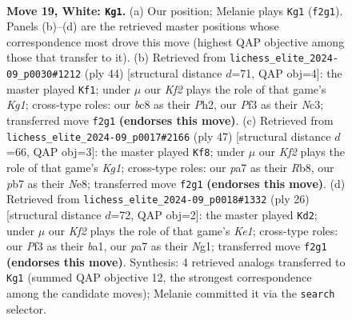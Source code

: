 \documentclass[11pt]{article}
\begin{document}
\begin{figure}[p]
\label{fig:thought-m34}
\end{figure}

\clearpage

\begin{figure}[p]\centering
\begin{subfigure}{0.46\textwidth}\centering
\resizebox{\linewidth}{!}{%
\newchessgame
\chessboard[
  setfen={r1b3k1/ppppn2p/8/5pp1/8/1PN2P2/P1PPBKPP/R7 w - - 0 19},
  showmover=false,
  pgfstyle=straightmove, color=movearrow, markmove={f2-g1}
]}
\caption{}
\end{subfigure}\hfill
\begin{subfigure}{0.46\textwidth}\centering
\resizebox{\linewidth}{!}{%
\newchessgame
\chessboard[
  setfen={r5k1/5p2/2pBbn1p/p7/2pRP1p1/2N3P1/PP3P1P/6K1 w - - 0 23},
  showmover=false,
  pgfstyle=straightmove, color=movearrow, markmove={g1-f1}
]}
\caption{}
\end{subfigure}
\\[4pt]
\begin{subfigure}{0.46\textwidth}\centering
\resizebox{\linewidth}{!}{%
\newchessgame
\chessboard[
  setfen={1r2n1k1/pp3pp1/1b2p2p/8/P7/1N2P3/1PR1BPPP/5K2 b - - 2 24},
  showmover=false,
  pgfstyle=straightmove, color=movearrow, markmove={g8-f8}
]}
\caption{}
\end{subfigure}\hfill
\begin{subfigure}{0.46\textwidth}\centering
\resizebox{\linewidth}{!}{%
\newchessgame
\chessboard[
  setfen={r1bB2k1/pp1n1p1p/6p1/8/2P1P3/5P2/P5PP/b3KBNR w K - 0 14},
  showmover=false,
  pgfstyle=straightmove, color=movearrow, markmove={e1-d2}
]}
\caption{}
\end{subfigure}
\caption{\textbf{Move 19, White: \texttt{Kg1}.} (a) Our position; Melanie plays \texttt{Kg1} (\texttt{f2g1}). Panels (b)--(d) are the retrieved master positions whose correspondence most drove this move (highest QAP objective among those that transfer to it). (b) Retrieved from \texttt{lichess\_elite\_2024-09\_p0030\#1212} (ply 44) [structural distance $d$=71, QAP obj=4]: the master played \texttt{Kf1}; under $\mu$ our \emph{Kf2} plays the role of that game's \emph{Kg1}; cross-type roles: our \emph{b}c8 as their \emph{P}h2, our \emph{P}f3 as their \emph{N}c3; transferred move \texttt{f2g1} \textbf{(endorses this move)}. (c) Retrieved from \texttt{lichess\_elite\_2024-09\_p0017\#2166} (ply 47) [structural distance $d$=66, QAP obj=3]: the master played \texttt{Kf8}; under $\mu$ our \emph{Kf2} plays the role of that game's \emph{Kg1}; cross-type roles: our \emph{p}a7 as their \emph{R}b8, our \emph{p}b7 as their \emph{N}e8; transferred move \texttt{f2g1} \textbf{(endorses this move)}. (d) Retrieved from \texttt{lichess\_elite\_2024-09\_p0018\#1332} (ply 26) [structural distance $d$=72, QAP obj=2]: the master played \texttt{Kd2}; under $\mu$ our \emph{Kf2} plays the role of that game's \emph{Ke1}; cross-type roles: our \emph{P}f3 as their \emph{b}a1, our \emph{p}a7 as their \emph{N}g1; transferred move \texttt{f2g1} \textbf{(endorses this move)}. Synthesis: 4 retrieved analogs transferred to \texttt{Kg1} (summed QAP objective 12, the strongest correspondence among the candidate moves); Melanie committed it via the \texttt{search} selector.}

\end{figure}
\end{document}
